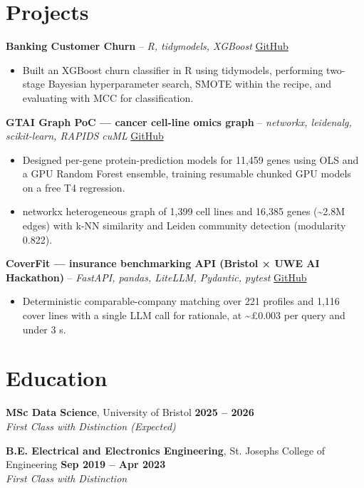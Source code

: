 \documentclass[a4paper,11pt]{article}
\begin{document}
\section{Projects}
\noindent\textbf{Banking Customer Churn} -- \textit{R, tidymodels, XGBoost} \hfill \href{https://github.com/Thiruvel-AP/Banking-Customer-Churn-Prediction}{GitHub}
\begin{itemize}
  \item Built an XGBoost churn classifier in R using tidymodels, performing two-stage Bayesian hyperparameter search, SMOTE within the recipe, and evaluating with MCC for classification.
\end{itemize}
\vspace{3pt}
\noindent\textbf{GTAI Graph PoC — cancer cell-line omics graph} -- \textit{networkx, leidenalg, scikit-learn, RAPIDS cuML} \hfill \href{https://github.com/Thiruvel-AP/GTAI-GraphPOC}{GitHub}
\begin{itemize}
  \item Designed per-gene protein-prediction models for 11,459 genes using OLS and a GPU Random Forest ensemble, training resumable chunked GPU models on a free T4 regression.
  \item networkx heterogeneous graph of 1,399 cell lines and 16,385 genes (\textasciitilde{}2.8M edges) with k-NN similarity and Leiden community detection (modularity 0.822).
\end{itemize}
\vspace{3pt}
\noindent\textbf{CoverFit — insurance benchmarking API (Bristol × UWE AI Hackathon)} -- \textit{FastAPI, pandas, LiteLLM, Pydantic, pytest} \hfill \href{https://github.com/Thiruvel-AP/AIHackathon-Phoenix}{GitHub}
\begin{itemize}
  \item Deterministic comparable-company matching over 221 profiles and 1,116 cover lines with a single LLM call for rationale, at \textasciitilde{}£0.003 per query and under 3 s.
\end{itemize}

\section{Education}
\textbf{MSc Data Science}, University of Bristol \hfill \textbf{2025 – 2026}\\ \textit{First Class with Distinction (Expected)}\par
\vspace{3pt}
\textbf{B.E. Electrical and Electronics Engineering}, St. Joseph\textquotesingle{}s College of Engineering \hfill \textbf{Sep 2019 – Apr 2023}\\ \textit{First Class with Distinction}\par
\end{document}
